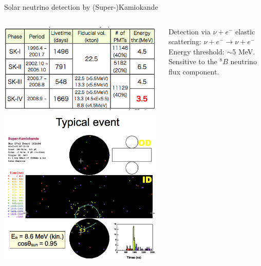 \begin{frame}[t]{Solar neutrino detection by (Super-)Kamiokande}
\begin{columns}
\begin{column}{0.30\textwidth}
     \includegraphics[width=0.99\textwidth]{./images/3nu/solar/sk_phases_and_solar_exposure.png}\\
     \includegraphics[width=0.99\textwidth]{./images/3nu/solar/sk_solar_event.png}\\
  \end{column}
  \begin{column}{0.30\textwidth}
    {\scriptsize
     Detection via $\nu+e^{-}$ elastic scattering: {\color{red}$\nu+e^{-} \rightarrow \nu+e^{-}$}\\
     \vspace{0.2cm}
     Energy threshold: $\sim$5 MeV.\\
     Sensitive to the $^{8}B$ neutrino flux component.
}
\end{column}
\end{columns}
\end{frame}
